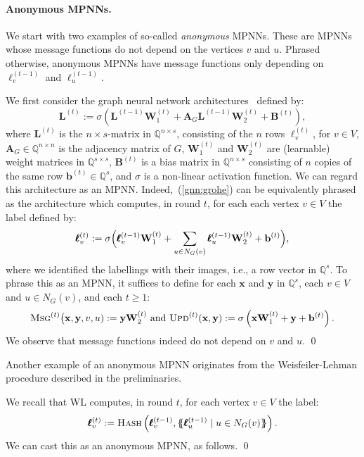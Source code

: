 \paragraph{Anonymous MPNNs.}
We start with two examples of so-called \textit{anonymous}  MPNNs. These are MPNNs whose message functions do not depend on the vertices $v$ and $u$. Phrased otherwise, anonymous MPNNs have message functions only depending on $\pmb{\ell}_v^{(t-1)}$ and $\pmb{\ell}_u^{(t-1)}$.
\begin{example}\label{ex:GNN}\normalfont
We first consider
the graph neural network
architectures~\cite{Hamilton2017a,grohewl} defined by:
\begin{equation}
\mathbf{L}^{(t)}:=\sigma\left(\mathbf{L}^{(t-1)}\mathbf{W}_1^{(t)}+\mathbf{A}_G\mathbf{L}^{(t-1)}\mathbf{W}_2^{(t)}+\mathbf{B}^{(t)}\right), \label{gnn:grohe}
\end{equation}
where $\mathbf{L}^{(t)}$ is the $n\times s$-matrix in $\mathbb{Q}^{n\times s}$, consisting of the $n$ rows $\pmb{\ell}^{(t)}_v$, for $v\in V$, $\mathbf{A}_G\in\mathbb{Q}^{n\times n}$ is the adjacency matrix of $G$, $\mathbf{W}_1^{(t)}$ and $\mathbf{W}_2^{(t)}$ are (learnable) weight matrices in $\mathbb{Q}^{s\times s}$,
$\mathbf{B}^{(t)}$ is a bias matrix in $\mathbb{Q}^{n\times s}$ consisting of $n$ copies of the same row $\mathbf{b}^{(t)}\in \mathbb{Q}^s$, and $\sigma$ is a non-linear activation function. We can regard this architecture as an MPNN. Indeed,~(\ref{gnn:grohe}) can be equivalently phrased as the architecture which computes, in round $t$, for each each vertex $v\in V$ the label defined by:
$$
\pmb{\ell}^{(t)}_v:=\sigma\Bigl(\pmb{\ell}^{(t-1)}_v\mathbf{W}_1^{(t)}+ \sum_{u\in N_G(v)}\pmb{\ell}^{(t-1)}_u\mathbf{W}_2^{(t)}+\mathbf{b}^{(t)} \Bigr),
$$
where we identified the labellings with their images, i.e., a row vector in $\mathbb{Q}^s$. 
To phrase this as an MPNN, it suffices to define for each $\mathbf{x}$ and $\mathbf{y}$ in $\mathbb{Q}^s$, each $v\in V$ and $u\in N_G(v)$, and each $t\geq 1$:
\begin{equation*}
	\textsc{Msg}^{(t)}\bigl(\mathbf{x},\mathbf{y},v,u):=\mathbf{y}\mathbf{W}_2^{(t)}
\text{ and } 
\textsc{Upd}^{(t)}(\mathbf{x},\mathbf{y}):=\sigma\left(\mathbf{x}\mathbf{W}_1^{(t)}+\mathbf{y} + \mathbf{b}^{(t)}\right).
\end{equation*} 
We observe that  message functions indeed do not depend on $v$ and $u$. \qed
\end{example}
Another example of an anonymous MPNN originates from the Weisfeiler-Lehman procedure described in the preliminaries.
\begin{example}\label{ex:WL}\normalfont
We recall that WL computes, in round $t$, for each vertex $v\in V$ the label:
$$
\pmb{\ell}^{(t)}_v:=\textsc{Hash}\left(\pmb{\ell}^{(t-1)}_v,\{\!\!\{ \pmb{\ell}_u^{(t-1)} \mathrel{\mid} u \in N_G(v) \}\!\!\}\right).
$$
We can cast this as an anonymous MPNN, as follows. 
\qed
 \end{example}

